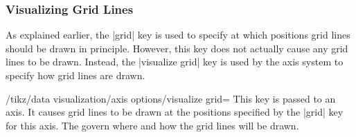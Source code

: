 \subsubsection{Visualizing Grid Lines}
\label{section-dv-visualize-gridlines}

As explained earlier, the |grid| key is used to specify at which positions grid
lines should be drawn in principle. However, this key does not actually cause
any grid lines to be drawn. Instead, the |visualize grid| key is used by the
axis system to specify how grid lines are drawn.

\begin{key}{/tikz/data visualization/axis options/visualize grid=}
    This key is passed to an axis. It causes grid lines to be drawn at the
    positions specified by the |grid| key for this axis. The 
    govern where and how the grid lines will be drawn.



\end{key}
